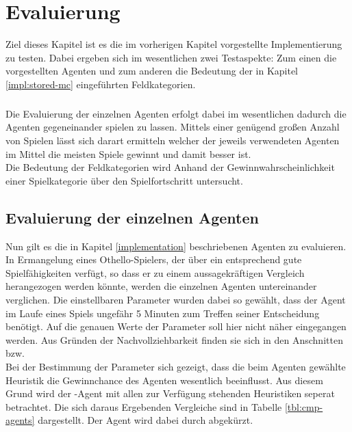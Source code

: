 \chapter{Evaluierung}
Ziel dieses Kapitel ist es die im vorherigen Kapitel vorgestellte Implementierung zu testen. Dabei ergeben sich im wesentlichen zwei Testaspekte: Zum einen die vorgestellten Agenten und zum anderen die Bedeutung der in Kapitel \ref{impl:stored-mc} eingeführten Feldkategorien.
\paragraph{}
Die Evaluierung der einzelnen Agenten erfolgt dabei im wesentlichen dadurch die Agenten gegeneinander spielen zu lassen. Mittels einer genügend großen Anzahl von Spielen lässt sich darart ermitteln welcher der jeweils verwendeten Agenten im Mittel die meisten Spiele gewinnt und damit besser ist.
\\Die Bedeutung der Feldkategorien wird Anhand der Gewinnwahrscheinlichkeit einer Spielkategorie über den Spielfortschritt untersucht.
\section{Evaluierung der einzelnen Agenten}
Nun gilt es die in Kapitel \ref{implementation} beschriebenen Agenten zu evaluieren. In Ermangelung eines Othello-Spielers, der über ein entsprechend gute Spielfähigkeiten verfügt, so dass er zu einem aussagekräftigen Vergleich herangezogen werden könnte, werden die einzelnen Agenten untereinander verglichen. Die einstellbaren Parameter wurden dabei so gewählt, dass der Agent im Laufe eines Spiels ungefähr 5 Minuten zum Treffen seiner Entscheidung benötigt. Auf die genauen Werte der Parameter soll hier nicht näher eingegangen werden. Aus Gründen der Nachvollziehbarkeit finden sie sich in den Anschnitten  bzw. 
\\Bei der Bestimmung der Parameter sich gezeigt, dass die beim Agenten  gewählte Heuristik die Gewinnchance des Agenten wesentlich beeinflusst. Aus diesem Grund wird der -Agent mit allen zur Verfügung stehenden Heuristiken seperat betrachtet. Die sich daraus Ergebenden Vergleiche sind in Tabelle \ref{tbl:cmp-agents} dargestellt. Der Agent  wird dabei durch  abgekürzt.
